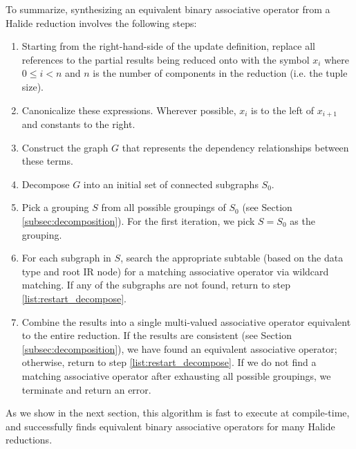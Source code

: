 To summarize, synthesizing an equivalent binary associative operator from a Halide reduction involves the following steps:
\begin{enumerate}
 	\item Starting from the right-hand-side of the update definition, replace all references to the partial results being reduced onto with the symbol $x_i$ where $0 \le i < n$ and $n$ is the number of components in the reduction (i.e. the tuple size).
        \item Canonicalize these expressions. Wherever possible, $x_i$ is to the left of $x_{i+1}$ and constants to the right.
        \item Construct the graph $G$ that represents the dependency relationships between these terms.
        \item Decompose $G$ into an initial set of connected subgraphs $S_0$.
	\item Pick a grouping $S$ from all possible groupings of $S_0$ (see Section \ref{subsec:decomposition}). For the first iteration, we pick $S = S_0$ as the grouping. \label{list:restart_decompose}
	\item For each subgraph in $S$, search the appropriate subtable (based on the data type and root IR node) for a matching associative operator via wildcard matching. If any of the subgraphs are not found, return to step \ref{list:restart_decompose}.
	\item Combine the results into a single multi-valued associative operator equivalent to the entire reduction. If the results are consistent (see Section \ref{subsec:decomposition}), we have found an equivalent associative operator; otherwise, return to step \ref{list:restart_decompose}. If we do not find a matching associative operator after exhausting all possible groupings, we terminate and return an error.
\end{enumerate}
As we show in the next section, this algorithm is fast to execute at compile-time, and successfully finds equivalent binary associative operators for many Halide reductions.
